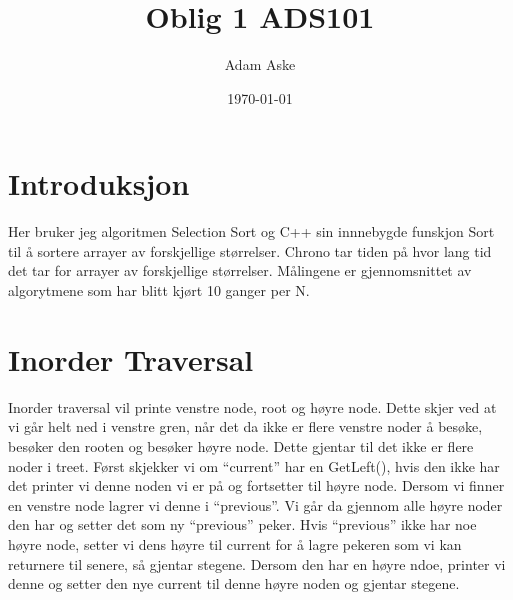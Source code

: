 \documentclass[a4paper,norsk]{article}
\title{Oblig 1 ADS101}
\date{\today}
\author{Adam Aske}
\begin{document}
\maketitle
\tableofcontents
\newpage

\section{Introduksjon}
Her bruker jeg algoritmen Selection Sort og C++ sin innnebygde funskjon Sort til å sortere arrayer av forskjellige størrelser. 
Chrono tar tiden på hvor lang tid det tar for arrayer av forskjellige størrelser. 
Målingene er gjennomsnittet av algorytmene som har blitt kjørt 10 ganger per N.

\section{Inorder Traversal}
Inorder traversal vil printe venstre node, root og høyre node. Dette skjer ved at vi går helt ned i venstre gren, når det da ikke er flere venstre noder å besøke,
besøker den rooten og besøker høyre node. Dette gjentar til det ikke er flere noder i treet.
Først skjekker vi om ``current'' har en GetLeft(), hvis den ikke har det printer vi denne noden vi er på og fortsetter til høyre node. 
Dersom vi finner en venstre node lagrer vi denne i ``previous''. Vi går da gjennom alle høyre noder den har og setter det som ny ``previous'' peker.
 Hvis ``previous'' ikke  har noe høyre node, setter vi dens høyre til current for å lagre pekeren som vi kan returnere til senere, så gjentar stegene. 
 Dersom den har en høyre ndoe, printer vi denne og setter den nye current til denne høyre noden og gjentar stegene. 
\end{document}
